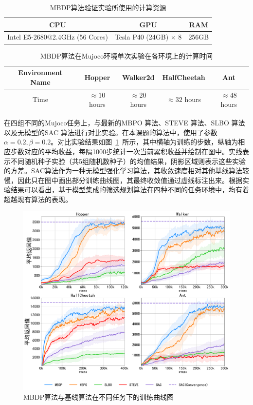 \begin{table}[hbp]
\centering
\caption{MBDP算法验证实验所使用的计算资源}
\begin{tabular}{ccc}
\toprule
CPU                      & GPU                         & RAM   \\
\midrule
Intel E5-2680@2.4GHz (56 Cores) & Tesla P40 (24GB) $\times$ 8 & 256GB\\
\bottomrule
\end{tabular}
\label{tab:computing-resources}
\end{table}

\begin{table}[hbp]
\centering
\caption{MBDP算法在Mujoco环境单次实验在各环境上的计算时间}
\begin{tabular}{ccccc}
\toprule
Environment Name  & Hopper      & Walker2d    & HalfCheetah & Ant         \\
\midrule
Time & $\approx 10$ hours & $\approx 20$ hours & $\approx 32$ hours & $\approx 48$ hours \\
\bottomrule
\end{tabular}
\label{tab:run-time}
\end{table}

在四组不同的Mujoco任务上，与最新的MBPO \cite{janner2019trust}算法、STEVE \cite{buckman2018sample}算法、SLBO \cite{Luo2019AlgorithmicGuarantees}算法以及无模型的SAC \cite{haarnoja2018soft}算法进行对比实验。在本课题的算法中，使用了参数$\alpha=0.2, \beta=0.2$。对比实验结果如图~\ref{fig:performance}~所示，其中横轴为训练的步数，纵轴为相应步数对应的平均收益，每隔1000步统计一次当前累积收益并绘制在图中。实线表示不同随机种子实验（共5组随机数种子）的均值结果，阴影区域则表示这些实验的方差。SAC算法作为一种无模型强化学习算法，其收敛速度相对其他基线算法较慢，因此只在图中画出部分训练曲线图，其最终收敛值通过虚线标注出来。根据实验结果可以看出，基于模型集成的筛选规划算法在四种不同的任务环境中，均有着超越现有算法的表现。

\begin{figure}[ht]
  \centering
  \includegraphics[width=\textwidth]{figures/performance.pdf}
  \caption{MBDP算法与基线算法在不同任务下的训练曲线图}
  \label{fig:performance}
\end{figure}

